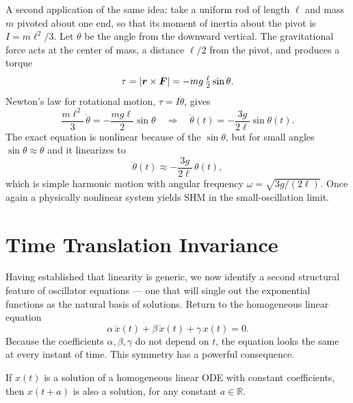 A second application of the same idea: take a uniform rod of length $\ell$ and mass $m$ pivoted about one end, so that its moment of inertia about the pivot is $I = m\ell^2/3$. Let $\theta$ be the angle from the downward vertical. The gravitational force acts at the center of mass, a distance $\ell/2$ from the pivot, and produces a torque
\begin{equation}
    \tau = |\lvect{r}\times\vect{F}| = -mg\,\tfrac{\ell}{2}\sin\theta.
\end{equation}
Newton's law for rotational motion, $\tau = I\ddot{\theta}$, gives
\begin{equation}
    \frac{m\ell^2}{3}\,\ddot{\theta} = -\frac{mg\ell}{2}\sin\theta \quad\Longrightarrow\quad \ddot{\theta}(t) = -\frac{3g}{2\ell}\sin\theta(t).
\end{equation}
The exact equation is nonlinear because of the $\sin\theta$, but for small angles $\sin\theta \approx \theta$ and it linearizes to
\begin{equation}
    \ddot{\theta}(t) \approx -\frac{3g}{2\ell}\,\theta(t),
\end{equation}
which is simple harmonic motion with angular frequency $\omega = \sqrt{3g/(2\ell)}$. Once again a physically nonlinear system yields SHM in the small-oscillation limit.

\section{Time Translation Invariance}

Having established that linearity is generic, we now identify a second structural feature of oscillator equations --- one that will single out the exponential functions as the natural basis of solutions. Return to the homogeneous linear equation
\begin{equation}
    \alpha\,\ddot{x}(t) + \beta\,\dot{x}(t) + \gamma\,x(t) = 0. \label{eq:homog}
\end{equation}
Because the coefficients $\alpha, \beta, \gamma$ do not depend on $t$, the equation looks the same at every instant of time. This symmetry has a powerful consequence.

\begin{fact}
If $x(t)$ is a solution of a homogeneous linear ODE with constant coefficients, then $x(t + a)$ is also a solution, for any constant $a \in \mathbb{R}$.
\end{fact}

